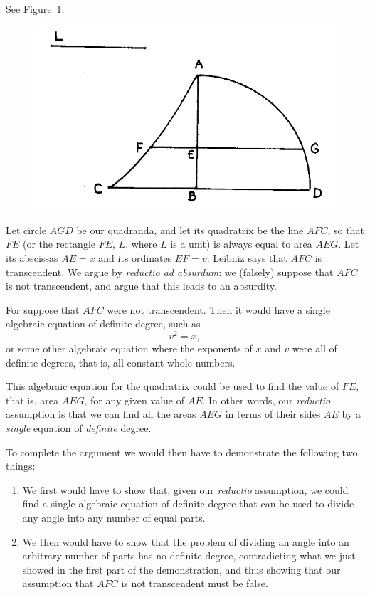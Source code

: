 \documentclass[twoside,openright]{article}
\begin{document}
  See Figure~\ref{circquad2}.
  \begin{figure}[htp]
\begin{center}
\includegraphics[width=.75\textwidth]{fig/Figure31}
\caption{}
\label{circquad2}
\vspace{-10pt}
\end{center}
\end{figure} 

Let circle $AGD$ be our quadranda, and let its quadratrix be the line
$AFC$, so that $FE$ (or the rectangle $FE$, $L$, where $L$ is a unit)
is always equal to area $AEG$.  Let its abscissas $AE = x$ and its
ordinates $EF = v$.  Leibniz says that $AFC$ is transcendent.  We
argue by {\em reductio ad absurdum}: we (falsely) suppose that $AFC$
is not transcendent, and argue that this leads to an absurdity.
   
For suppose that $AFC$ were not transcendent.  Then it would have a
single algebraic equation of definite degree, such as
$$v^2 = x,$$
or some other algebraic equation where the exponents of $x$ and $v$
were all of definite degrees, that is, all constant whole numbers.

This algebraic equation for the quadratrix could be used to find the
value of $FE$, that is, area $AEG$, for any given value of $AE$.  In
other words, our {\em reductio} assumption is that we can find all the
areas $AEG$ in terms of their sides $AE$ by a {\em single} equation of
{\em definite} degree.

To complete the argument we would then have to demonstrate the following two things:
\begin{enumerate}
\item We first would have to show that, given our {\em reductio}
  assumption, we could find a single algebraic equation of definite
  degree that can be used to divide any angle into any number of equal
  parts.
\item We then would have to show that the problem of dividing an angle
  into an arbitrary number of parts has no definite degree,
  contradicting what we just showed in the first part of the
  demonstration, and thus showing that our assumption that $AFC$ is
  not transcendent must be false.
\end{enumerate}\label{endtc}
\end{document}
